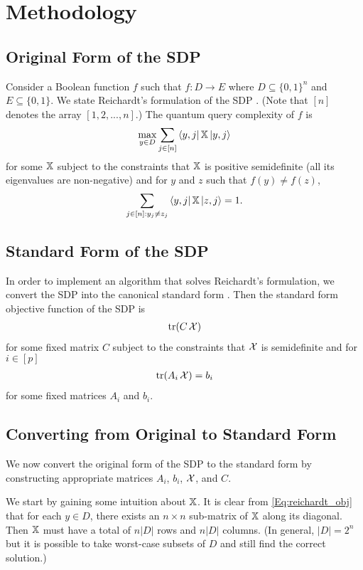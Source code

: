 \section{Methodology}\label{sec:method}

\subsection{Original Form of the SDP}
Consider a Boolean function $f$ such that
$f: D \rightarrow E$ where 
$D \subseteq {\{0,1\}}^n$ and $E \subseteq {\{0,1\}}$.
We state Reichardt's formulation of the SDP \cite{reichardt2009span}.
(Note that $[n]$ denotes the array
$[1,2,...,n]$.)
The quantum query complexity of $f$ is
\begin{align} \label{Eq:reichardt_obj} 
    \max_{y \in D} \sum_{j \in [n]} \bra{y,j}\operatorname{\mathbb{X}}\ket{y,j} 
\end{align}
for some $\operatorname{\mathbb{X}}$ subject to the constraints that $\operatorname{\mathbb{X}}$ is positive semidefinite
(all its eigenvalues are non-negative)
and for $y$ and $z$ such that $f(y) \neq f(z)$,
\begin{align}\label{Eq:reichardt_F0}
    \sum_{j \in [n]: y_j \ne z_j} 
    \bra{y,j} \operatorname{\mathbb{X}} \ket{z, j} = 1.
\end{align}

\subsection{Standard Form of the SDP}
In order to implement an algorithm that solves 
Reichardt's formulation, we convert the SDP
into the canonical standard form
\cite{boyd2004convex}.
Then the standard form objective function of the SDP is
\begin{align}\label{Eq:boyd_obj}
    \operatorname{\text{tr}}(C\operatorname{\mathcal{X}})
\end{align}
for some fixed matrix $C$ subject to the constraints
that $\operatorname{\mathcal{X}}$ is semidefinite and for $i \in [p]$
\begin{align} \label{Eq:boyd_trace}
    \operatorname{\text{tr}}(A_i \operatorname{\mathcal{X}}) = b_i
\end{align}
for some fixed matrices $A_i$ and $b_i$.

\subsection{Converting from Original to Standard Form}
We now convert the original form of the SDP to
the standard form by constructing appropriate matrices $A_i$, $b_i$, $\operatorname{\mathcal{X}}$, and $C$.

We start by gaining some intuition about $\operatorname{\mathbb{X}}$.
It is clear from \cref{Eq:reichardt_obj} that for 
each $y \in D$, there exists an $n \times n$ sub-matrix of $\operatorname{\mathbb{X}}$ along its diagonal.
Then $\operatorname{\mathbb{X}}$ must have a total of $n|D|$ rows and $n|D|$ columns.
(In general, $|D| = 2^n$ but it is possible to take 
worst-case subsets of $D$ and still find the correct solution.)


